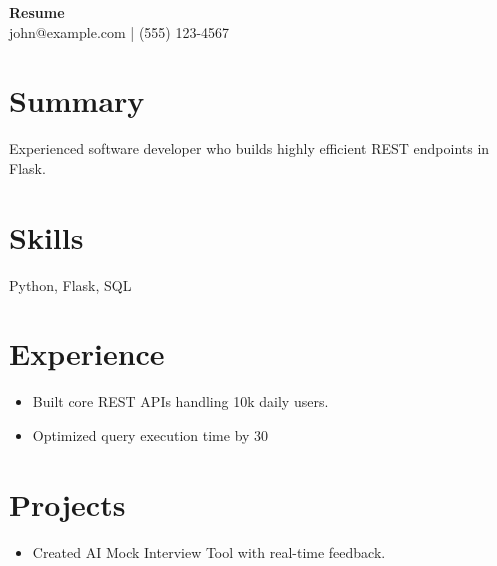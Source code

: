 \documentclass[11pt]{article}
\begin{document}
\begin{center}
    {\Large \textbf{Resume}}\\
    john@example.com | (555) 123-4567
\end{center}

\vspace{5pt}

\section*{Summary}
Experienced software developer who builds highly efficient REST endpoints in Flask.

\section*{Skills}
Python, Flask, SQL

\section*{Experience}
\begin{itemize}
\item Built core REST APIs handling 10k daily users.
\item Optimized query execution time by 30%

\end{itemize}

\section*{Projects}
\begin{itemize}
\item Created AI Mock Interview Tool with real-time feedback.

\end{itemize}
\end{document}
